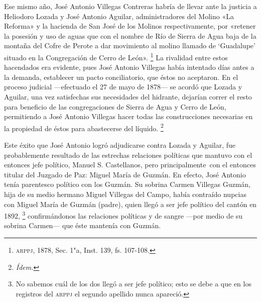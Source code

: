 \documentclass[14pt,twoside,final]{extbook} %
\let\oldfootnote\footnote
\renewcommand\footnote[1]{%
\oldfootnote{\hspace{1mm}#1}}
\begin{document}
Ese mismo año, José Antonio Villegas Contreras habría de llevar ante la justicia a Heliodoro Lozada y José Antonio Aguilar, administradores del Molino «La Reforma» y la hacienda de San José de los Molinos respectivamente, por «retener la posesión y uso de aguas que con el nombre de Río de Sierra de Agua baja de la montaña del Cofre de Perote a dar movimiento al molino llamado de  `Guadalupe' situado en la Congregación de Cerro de León».\footnote{\textsc{arppj}, 1878, Sec. 1"a, Inst. 139, fs. 107-108.} La rivalidad entre estos hacendados era evidente, pues José Antonio Villegas había intentado días antes a la demanda, establecer un pacto conciliatorio, que éstos no aceptaron. En el proceso judicial ---efectuado el 27 de mayo de 1878--- se acordó que Lozada y Aguilar, una vez satisfechas sus necesidades del hidrante, dejarían correr el resto para beneficio de las congregaciones de Sierra de Agua y Cerro de León, permitiendo a José Antonio Villegas hacer todas las construcciones necesarias en la propiedad de éstos para abastecerse del líquido.\footnote{\em Ídem.}

Este éxito que José Antonio logró adjudicarse contra Lozada y Aguilar, fue probablemente resultado de las estrechas relaciones políticas que mantuvo con el entonces jefe político, Manuel S. Castellanos, pero principalmente~con el entonces titular del Juzgado de Paz: Miguel María de Guzmán. En efecto, José Antonio tenía parentesco político con los Guzmán. Su sobrina Carmen Villegas Guzmán, hija de su medio hermano Miguel Villegas del Campo, había contraído nupcias con Miguel María de Guzmán (padre), quien llegó a ser jefe político del cantón en 1892,\footnote{No sabemos cuál de los dos llegó a ser jefe político; esto se debe a que en los registros del \textsc{arppj} el segundo apellido nunca apareció.} confirmándonos las relaciones políticas y de sangre ---por medio de su sobrina Carmen--- que éste mantenía con Guzmán.
\end{document}
